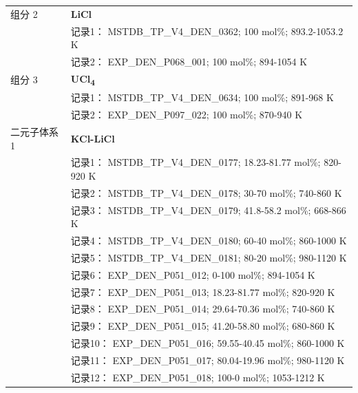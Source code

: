 \documentclass[12pt]{article}
\begin{document}
{\begin{longtable}[]{@{}
  >{\raggedright\arraybackslash}p{}
  >{\raggedright\arraybackslash}p{}@{}}
组分 2  & \textbf{LiCl} \\
 & 记录1： MSTDB\_TP\_V4\_DEN\_0362; 100 mol\%; 893.2-1053.2 K \\
 & 记录2： EXP\_DEN\_P068\_001; 100 mol\%; 894-1054 K  \\

组分 3  & \textbf{UCl\textsubscript{4}} \\
 & 记录1： MSTDB\_TP\_V4\_DEN\_0634; 100 mol\%; 891-968 K \\
 & 记录2： EXP\_DEN\_P097\_022; 100 mol\%; 870-940 K  \\

二元子体系 1  & \textbf{KCl-LiCl} \\
 & 记录1： MSTDB\_TP\_V4\_DEN\_0177; 18.23-81.77 mol\%; 820-920 K \\
 & 记录2： MSTDB\_TP\_V4\_DEN\_0178; 30-70 mol\%; 740-860 K \\
 & 记录3： MSTDB\_TP\_V4\_DEN\_0179; 41.8-58.2 mol\%; 668-866 K \\
 & 记录4： MSTDB\_TP\_V4\_DEN\_0180; 60-40 mol\%; 860-1000 K \\
 & 记录5： MSTDB\_TP\_V4\_DEN\_0181; 80-20 mol\%; 980-1120 K \\
 & 记录6： EXP\_DEN\_P051\_012; 0-100 mol\%; 894-1054 K \\
 & 记录7： EXP\_DEN\_P051\_013; 18.23-81.77 mol\%; 820-920 K \\
 & 记录8： EXP\_DEN\_P051\_014; 29.64-70.36 mol\%; 740-860 K \\
 & 记录9： EXP\_DEN\_P051\_015; 41.20-58.80 mol\%; 680-860 K \\
 & 记录10： EXP\_DEN\_P051\_016; 59.55-40.45 mol\%; 860-1000 K \\
 & 记录11： EXP\_DEN\_P051\_017; 80.04-19.96 mol\%; 980-1120 K \\
 & 记录12： EXP\_DEN\_P051\_018; 100-0 mol\%; 1053-1212 K  \\


\end{longtable}}
\end{document}
